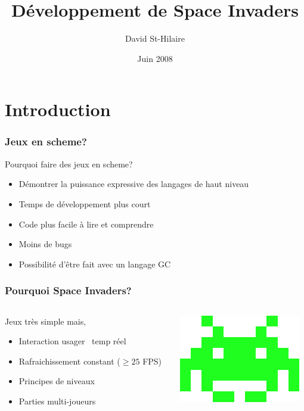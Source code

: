 \documentclass{beamer}
\title{Développement de Space Invaders}
\author{David St-Hilaire}
\date{Juin 2008}
\newcommand{\<}[1]{\`#1}
\begin{document}
\begin{frame}
\titlepage
\end{frame}


\section{Introduction}

\begin{frame}
  \frametitle{Jeux en scheme?}
  Pourquoi faire des jeux en scheme?
  \begin{itemize}
  \item Démontrer la puissance expressive des langages de haut
    niveau
  \item Temps de développement plus court
  \item Code plus facile à lire et comprendre
  \item Moins de bugs
  \item Possibilité d'être fait avec un langage GC
  \end{itemize}
\end{frame}

\begin{frame}
  \frametitle{Pourquoi Space Invaders?}

  \begin{columns}[c]
    \begin{column}{7cm} 
      Jeux très simple mais,
      \begin{itemize}
      \item Interaction usager ~temp réel
      \item Rafraichissement constant ($\ge 25$ FPS)
      \item Principes de niveaux
      \item Parties multi-joueurs
      \end{itemize}
    \end{column}
    \begin{column}{5cm} \includegraphics[scale=0.5]{medium} \end{column}
  \end{columns}
\end{frame}
\end{document}
